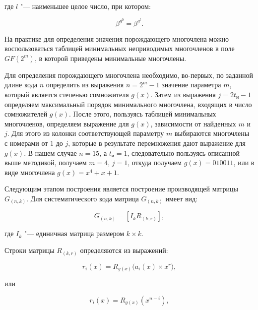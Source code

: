 \begin{ESKDexplanation}
\item[где ] $l$ "--- наименьшее целое число, при котором:
\end{ESKDexplanation}

\begin{equation*}
  \beta^{g^0} = \beta^{g^l}.
\end{equation*}

На практике для определения значения порождающего многочлена можно
воспользоваться таблицей минимальных неприводимых многочленов в поле
$GF(2^m)$, в которой приведены минимальные многочлены.

Для определения порождающего многочлена необходимо, во-первых, по
заданной длине кода $n$ определить из выражения $n = 2^m - 1$ значение
параметра $m$, который является степенью сомножителя $g(x)$. Затем из
выражения $j = 2t_{\text{и}} - 1$ определяем максимальный порядок
минимального многочлена, входящих в число сомножителей $g(x)$. После
этого, пользуясь таблицей минимальных многочленов, определяем
выражение для $g(x)$, зависимости от найденных $m$ и $j$. Для этого из
колонки соответствующей параметру $m$ выбираются многочлены с номерами
от $1$ до $j$, которые в результате перемножения дают выражение для
$g(x)$. В нашем случае $n = 15$, а $t_{\text{и}} = 1$, следовательно
пользуясь описанной выше методикой, получаем $m = 4$, $j = 1$, откуда
получаем $g(x)=010011$, или в виде многочлена $g(x)=x^4 + x + 1$.

Следующим этапом построения является построение производящей матрицы
$G_{(n,k)}$. Для систематического кода матрица $G_{(n, k)}$ имеет вид:

\begin{equation*}
  G_{(n,k)} = \left[I_k R_{(k, r)} \right],
\end{equation*}

\begin{ESKDexplanation}
\item[где ] $I_k$ "--- единичная матрица размером $k \times k$.
\end{ESKDexplanation}

Строки матрицы $R_{(k, r)}$ определяются из выражений:

\begin{equation}
\label{r_i(x)}
r_i(x) = R_{g(x)}\bigl(a_i(x) \times x^r \bigr),
\end{equation}

или

\begin{equation*}
r_i(x) = R_{g(x)}\left(x^{n-i} \right),
\end{equation*}

